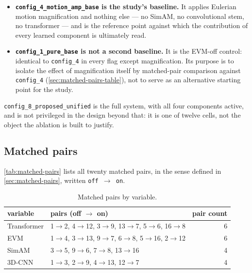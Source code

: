 \begin{itemize}
	\item \textbf{\texttt{config\_4\_motion\_amp\_base} is the study's baseline.} It applies Eulerian motion magnification and nothing else --- no SimAM, no convolutional stem, no transformer --- and is the reference point against which the contribution of every learned component is ultimately read.
	\item \textbf{\texttt{config\_1\_pure\_base} is not a second baseline.} It is the EVM-off control: identical to \texttt{config\_4} in every flag except magnification. Its purpose is to isolate the effect of magnification itself by matched-pair comparison against \texttt{config\_4} (\autoref{sec:matched-pairs-table}), not to serve as an alternative starting point for the study.
\end{itemize}

\texttt{config\_8\_proposed\_unified} is the full system, with all four components active, and is not privileged in the design beyond that: it is one of twelve cells, not the object the ablation is built to justify.

\subsection{Matched pairs}
\label{sec:matched-pairs-table}

\autoref{tab:matched-pairs} lists all twenty matched pairs, in the sense defined in \autoref{sec:matched-pairs}, written \texttt{off $\rightarrow$ on}.

\begin{table}[htbp]
	\centering
	\begin{tabular}{l l r}
		\hline
		\textbf{variable} & \textbf{pairs (off $\rightarrow$ on)} & \textbf{pair count} \\
		\hline
		Transformer & 1$\rightarrow$2, 4$\rightarrow$12, 3$\rightarrow$9, 13$\rightarrow$7, 5$\rightarrow$6, 16$\rightarrow$8 & 6 \\
		EVM         & 1$\rightarrow$4, 3$\rightarrow$13, 9$\rightarrow$7, 6$\rightarrow$8, 5$\rightarrow$16, 2$\rightarrow$12 & 6 \\
		SimAM       & 3$\rightarrow$5, 9$\rightarrow$6, 7$\rightarrow$8, 13$\rightarrow$16 & 4 \\
		3D-CNN      & 1$\rightarrow$3, 2$\rightarrow$9, 4$\rightarrow$13, 12$\rightarrow$7 & 4 \\
		\hline
	\end{tabular}
	\caption[Matched pairs by variable]{Matched pairs by variable.}
	\label{tab:matched-pairs}
\end{table}

